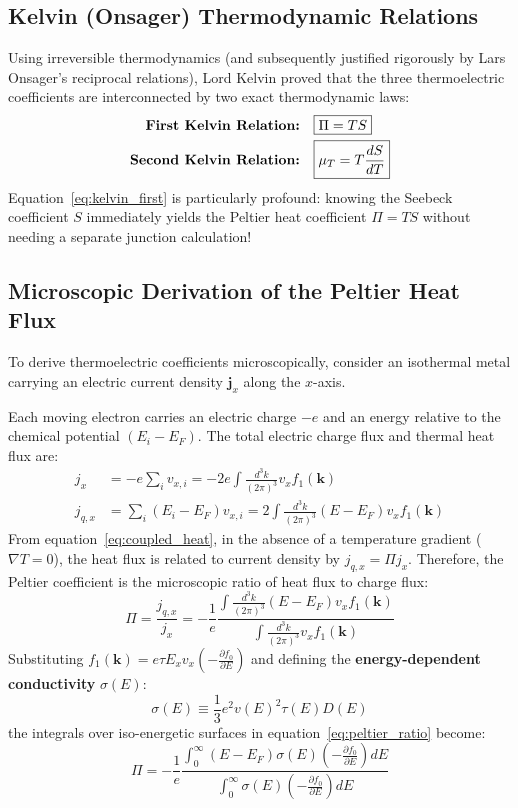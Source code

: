 \documentclass[11pt,a4paper]{article}
\newcommand{\vb}[1]{\mathbf{#1}}
\begin{document}
\subsection{Kelvin (Onsager) Thermodynamic Relations}
Using irreversible thermodynamics (and subsequently justified rigorously by Lars Onsager's reciprocal relations), Lord Kelvin proved that the three thermoelectric coefficients are interconnected by two exact thermodynamic laws:
\begin{align}
\text{\textbf{First Kelvin Relation:}} \quad &\boxed{\Pi = T S} \label{eq:kelvin_first} \\
\text{\textbf{Second Kelvin Relation:}} \quad &\boxed{\mu_T = T \frac{dS}{dT}} \label{eq:kelvin_second}
\end{align}
Equation~\eqref{eq:kelvin_first} is particularly profound: knowing the Seebeck coefficient $S$ immediately yields the Peltier heat coefficient $\Pi = TS$ without needing a separate junction calculation!

\subsection{Microscopic Derivation of the Peltier Heat Flux}
To derive thermoelectric coefficients microscopically, consider an isothermal metal carrying an electric current density $\vb{j}_x$ along the $x$-axis.

Each moving electron carries an electric charge $-e$ and an energy relative to the chemical potential $(E_i - E_F)$. The total electric charge flux and thermal heat flux are:
\begin{align}
j_x &= -e\sum_i v_{x,i} = -2e\int \frac{d^3k}{(2\pi)^3} v_x f_1(\vb{k}) \\
j_{q,x} &= \sum_i (E_i - E_F) v_{x,i} = 2\int \frac{d^3k}{(2\pi)^3} (E - E_F) v_x f_1(\vb{k})
\end{align}
From equation~\eqref{eq:coupled_heat}, in the absence of a temperature gradient ($\nabla T = 0$), the heat flux is related to current density by $j_{q,x} = \Pi j_x$. Therefore, the Peltier coefficient is the microscopic ratio of heat flux to charge flux:
\begin{equation}
\Pi = \frac{j_{q,x}}{j_x} = -\frac{1}{e}\frac{\int \frac{d^3k}{(2\pi)^3} (E - E_F) v_x f_1(\vb{k})}{\int \frac{d^3k}{(2\pi)^3} v_x f_1(\vb{k})}
\label{eq:peltier_ratio}
\end{equation}
Substituting $f_1(\vb{k}) = e\tau E_x v_x \left(-\frac{\partial f_0}{\partial E}\right)$ and defining the \textbf{energy-dependent conductivity} $\sigma(E)$:
\begin{equation}
\sigma(E) \equiv \frac{1}{3} e^2 v(E)^2 \tau(E) D(E)
\label{eq:energy_dep_sigma}
\end{equation}
the integrals over iso-energetic surfaces in equation~\eqref{eq:peltier_ratio} become:
\begin{equation}
\Pi = -\frac{1}{e}\frac{\int_0^\infty (E - E_F) \sigma(E)\left(-\frac{\partial f_0}{\partial E}\right)dE}{\int_0^\infty \sigma(E)\left(-\frac{\partial f_0}{\partial E}\right)dE}
\label{eq:pi_sigma_integrals}
\end{equation}
\end{document}
